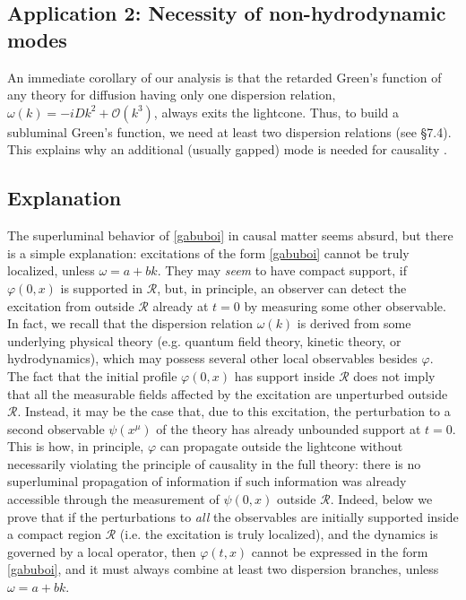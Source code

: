 \documentclass[prl, amsfonts, amssymb, amsmath, nofootinbib,reprint, showkeys, twoside,notitlepage]{revtex4-2}
\theoremstyle{definition}
\theoremstyle{theorem}
\theoremstyle{corollary}
\begin{document}
\subsection{Application 2: Necessity of non-hydrodynamic modes} An immediate corollary of our analysis is that the retarded Green's function of any theory for diffusion having only one dispersion relation, $\omega(k) = -iDk^2+\mathcal{O}(k^3)$, always exits the lightcone. Thus, to build a subluminal Green's function, we need at least two dispersion relations (see \cite{Morse1953} \S 7.4). This explains why an additional (usually gapped) mode is needed for causality \cite{HellerBounds2022}. 



\subsection{Explanation} The superluminal behavior of \eqref{gabuboi} in causal matter seems absurd, but there is a simple explanation: excitations of the form \eqref{gabuboi} cannot be truly localized, unless $\omega {=}a{+}bk$. They may \textit{seem} to have compact support, if $\varphi(0,x)$ is supported in $\mathcal{R}$, but, in principle, an observer can detect the excitation from outside $\mathcal{R}$ already at $t=0$ by measuring some other observable. 
In fact, we recall that the dispersion relation $\omega(k)$ is derived from some underlying physical theory (e.g. quantum field theory, kinetic theory, or hydrodynamics), which may possess several other local observables besides $\varphi$. The fact that the initial profile $\varphi(0,x)$ has support inside $\mathcal{R}$ does not imply that all the measurable fields affected by the excitation are unperturbed outside $\mathcal{R}$. Instead, it may be the case that, due to this excitation, the perturbation to a second observable $\psi(x^\mu)$ of the theory has already unbounded support at $t=0$. This is how, in principle, $\varphi$ can propagate outside the lightcone without necessarily violating the principle of causality in the full theory: there is no superluminal propagation of information if such information was already accessible through the measurement of $\psi(0,x)$ outside $\mathcal{R}$. Indeed, below we prove that if the perturbations to \textit{all} the observables are initially supported inside a compact region $\mathcal{R}$ (i.e. the excitation is truly localized), and the dynamics is governed by a local operator, then $\varphi(t,x)$ cannot be expressed in the form \eqref{gabuboi}, and it must always combine at least two dispersion branches, unless $\omega=a{+}bk$.
\end{document}
